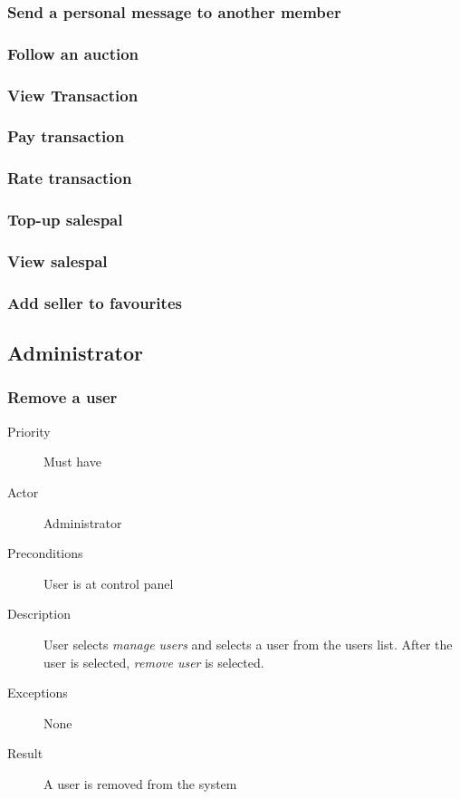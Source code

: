 \documentclass[a4paper, 12pt]{report}
\begin{document}
		\subsubsection{Send a personal message to another member}
		\subsubsection{Follow an auction}
		\subsubsection{View Transaction}
		\subsubsection{Pay transaction}
		\subsubsection{Rate transaction}
		\subsubsection{Top-up salespal}
		\subsubsection{View salespal}
		\subsubsection{Add seller to favourites}
	\subsection{Administrator}
		\subsubsection{Remove a user}
			\begin{description}
				\item[Priority] Must have
				\item[Actor] Administrator
				\item[Preconditions] User is at control panel
				\item[Description] User selects \emph{manage users} and selects a user from the users list.
				After the user is selected, \emph{remove user} is selected.
				\item[Exceptions] None
				\item[Result] A user is removed from the system
			\end{description}	
\end{document}
